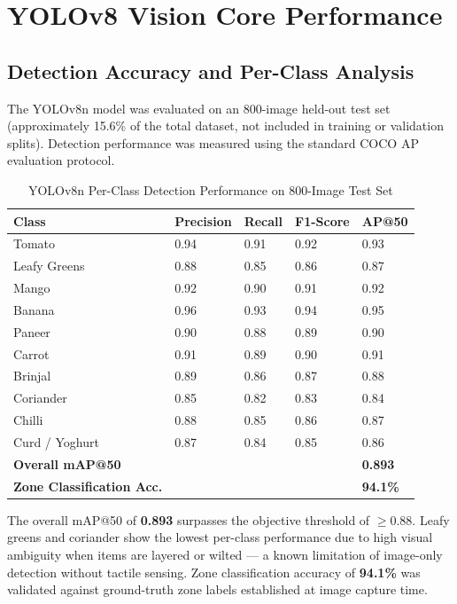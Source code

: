 \documentclass[12pt,a4paper]{report}
\begin{document}
\section{YOLOv8 Vision Core Performance}

\subsection{Detection Accuracy and Per-Class Analysis}

The YOLOv8n model was evaluated on an 800-image held-out test set (approximately 15.6\% of the total dataset, not included in training or validation splits). Detection performance was measured using the standard COCO AP evaluation protocol.

\begin{table}[ht]
\centering
\caption{YOLOv8n Per-Class Detection Performance on 800-Image Test Set}
\label{tab:yolo_results}
\begin{tabularx}{\textwidth}{L{0.22\textwidth} C{0.15\textwidth} C{0.15\textwidth} C{0.15\textwidth} C{0.18\textwidth}}
\toprule
\textbf{Class} & \textbf{Precision} & \textbf{Recall} & \textbf{F1-Score} & \textbf{AP@50} \\
\midrule
Tomato & 0.94 & 0.91 & 0.92 & 0.93 \\
Leafy Greens & 0.88 & 0.85 & 0.86 & 0.87 \\
Mango & 0.92 & 0.90 & 0.91 & 0.92 \\
Banana & 0.96 & 0.93 & 0.94 & 0.95 \\
Paneer & 0.90 & 0.88 & 0.89 & 0.90 \\
Carrot & 0.91 & 0.89 & 0.90 & 0.91 \\
Brinjal & 0.89 & 0.86 & 0.87 & 0.88 \\
Coriander & 0.85 & 0.82 & 0.83 & 0.84 \\
Chilli & 0.88 & 0.85 & 0.86 & 0.87 \\
Curd / Yoghurt & 0.87 & 0.84 & 0.85 & 0.86 \\
\midrule
\textbf{Overall mAP@50} & & & & \textbf{0.893} \\
\textbf{Zone Classification Acc.} & & & & \textbf{94.1\%} \\
\bottomrule
\end{tabularx}
\end{table}

The overall mAP@50 of \textbf{0.893} surpasses the objective threshold of $\geq$0.88. Leafy greens and coriander show the lowest per-class performance due to high visual ambiguity when items are layered or wilted — a known limitation of image-only detection without tactile sensing. Zone classification accuracy of \textbf{94.1\%} was validated against ground-truth zone labels established at image capture time.
\end{document}
